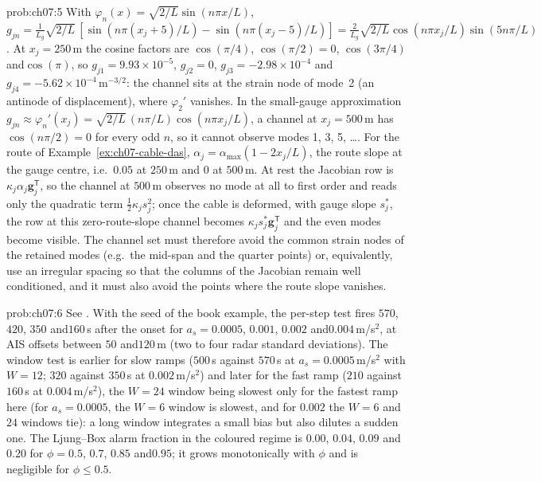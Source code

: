 \begin{sol}{prob:ch07:5}
With $\varphi_n(x)=\sqrt{2/L}\sin(n\pi x/L)$, $g_{jn}=\frac{1}{L_g}\sqrt{2/L}\,[\sin(n\pi(x_j+5)/L)-\sin(n\pi(x_j-5)/L)]=\frac{2}{L_g}\sqrt{2/L}\cos(n\pi x_j/L)\sin(5n\pi/L)$. At $x_j=250$\,m the cosine factors are $\cos(\pi/4)$, $\cos(\pi/2)=0$, $\cos(3\pi/4)$ and\allowbreak $\cos(\pi)$, so $g_{j1}=9.93\times10^{-5}$, $g_{j2}=0$, $g_{j3}=-2.98\times10^{-4}$ and\allowbreak $g_{j4}=-5.62\times10^{-4}$\,m$^{-3/2}$: the channel sits at the strain node of mode~2 (an antinode of displacement), where $\varphi_2'$ vanishes. In the small-gauge approximation $g_{jn}\approx\varphi_n'(x_j)=\sqrt{2/L}\,(n\pi/L)\cos(n\pi x_j/L)$, a channel at $x_j=500$\,m has $\cos(n\pi/2)=0$ for every odd $n$, so it cannot observe modes 1, 3, 5, \ldots. For the route of Example~\ref{ex:ch07-cable-das}, $\alpha_j=\alpha_{\max}(1-2x_j/L)$, the route slope at the gauge centre, i.e.\ $0.05$ at $250$\,m and $0$ at $500$\,m. At rest the Jacobian row is $\kappa_j\alpha_j\mathbf{g}_j^{\mathsf T}$, so the channel at $500$\,m observes no mode at all to first order and reads only the quadratic term $\tfrac12\kappa_js_j^{2}$; once the cable is deformed, with gauge slope $s_j^{\ast}$, the row at this zero-route-slope channel becomes $\kappa_js_j^{\ast}\mathbf{g}_j^{\mathsf T}$ and the even modes become visible. The channel set must therefore avoid the common strain nodes of the retained modes (e.g.\ the mid-span and the quarter points) or, equivalently, use an irregular spacing so that the columns of the Jacobian remain well conditioned, and it must also avoid the points where the route slope vanishes.
\end{sol}
\begin{sol}{prob:ch07:6}
See . With the seed of the book example, the per-step test fires $570$, $420$, $350$ and\allowbreak $160$\,s after the onset for $a_s=0.0005$, $0.001$, $0.002$ and\allowbreak $0.004$\,m/s$^{2}$, at AIS offsets between $50$ and\allowbreak $120$\,m (two to four radar standard deviations). The window test is earlier for slow ramps ($500$\,s against $570$\,s at $a_s=0.0005$\,m/s$^{2}$ with $W=12$; $320$ against $350$\,s at $0.002$\,m/s$^{2}$) and later for the fast ramp ($210$ against $160$\,s at $0.004$\,m/s$^{2}$), the $W=24$ window being slowest only for the fastest ramp here (for $a_s=0.0005$, the $W=6$ window is slowest, and for $0.002$ the $W=6$ and\allowbreak $24$ windows tie): a long window integrates a small bias but also dilutes a sudden one. The Ljung--Box alarm fraction in the coloured regime is $0.00$, $0.04$, $0.09$ and\allowbreak $0.20$ for $\phi=0.5$, $0.7$, $0.85$ and\allowbreak $0.95$; it grows monotonically with $\phi$ and is negligible for $\phi\le0.5$.
\end{sol}
